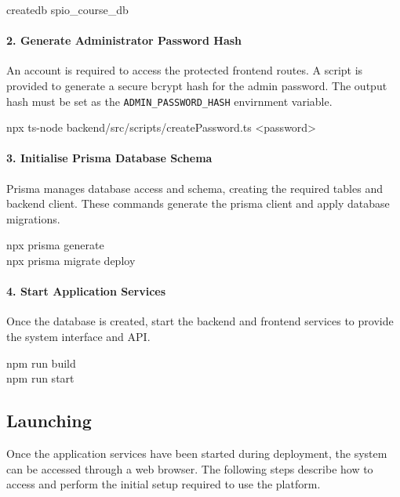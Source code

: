 \begin{commandbox}
createdb spio\_course\_db
\end{commandbox}

\paragraph{2. Generate Administrator Password Hash} An account is required to access the protected frontend routes. A script is provided to generate a secure bcrypt hash for the admin password. The output hash must be set as the \texttt{ADMIN\_PASSWORD\_HASH} envirnment variable. 

\begin{commandbox}
npx ts-node backend/src/scripts/createPassword.ts \textless password\textgreater
\end{commandbox}

\paragraph{3. Initialise Prisma Database Schema} 
Prisma manages database access and schema, creating the required tables and backend client. These commands generate the prisma client and apply database migrations. 

\begin{commandbox}[/backend]
npx prisma generate \\
npx prisma migrate deploy
\end{commandbox}

\paragraph{4. Start Application Services} \label{start_app_services} Once the database is created, start the backend and frontend services to provide the system interface and API.

\begin{commandbox}[/backend]
npm run build \\
npm run start
\end{commandbox}

\subsection{Launching}
\label{sec:launching}

Once the application services have been started during deployment, the system can be accessed through a web browser. The following steps describe how to access and perform the initial setup required to use the platform. 

